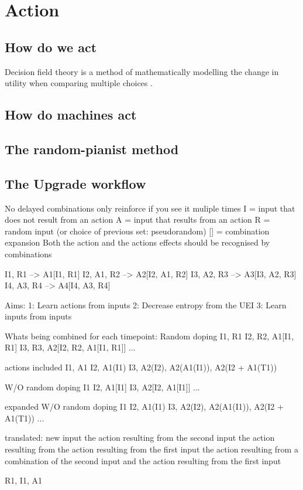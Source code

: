 \chapter{Action}
\section{How do we act}
Decision field theory is a method of mathematically modelling the change in utility when comparing multiple choices \cite{busemeyer2002survey}.

\section{How do machines act}

\section{The random-pianist method}


\section{The Upgrade workflow}
No delayed combinations
only reinforce if you see it muliple times
I = input that does not result from an action
A = input that results from an action
R = random input (or choice of previous set: pseudorandom)
[] = combination expansion
Both the action and the actions effects should be recognised by combinations

I1, R1        -->    A1[I1, R1]
I2, A1, R2    -->    A2[I2, A1, R2]
I3, A2, R3    -->    A3[I3, A2, R3]
I4, A3, R4    -->    A4[I4, A3, R4]

Aims:
1: Learn actions from inputs
2: Decrease entropy from the UEI
3: Learn inputs from inputs

Whats being combined for each timepoint:
Random doping
I1, R1
I2, R2, A1[I1, R1]
I3, R3, A2[I2, R2, A1[I1, R1]]
...

actions included
I1, A1
I2, A1(I1)
I3, A2(I2), A2(A1(I1)), A2(I2 + A1(T1))

W/O random doping
I1
I2, A1[I1]
I3, A2[I2, A1[I1]]
...

expanded W/O random doping
I1
I2, A1(I1)
I3, A2(I2), A2(A1(I1)), A2(I2 + A1(T1))
...

translated:
new input
the action resulting from the second input
the action resulting from the action resulting from the first input
the action resulting from a combination of the second input and the action resulting from the first input 

R1, I1, A1

